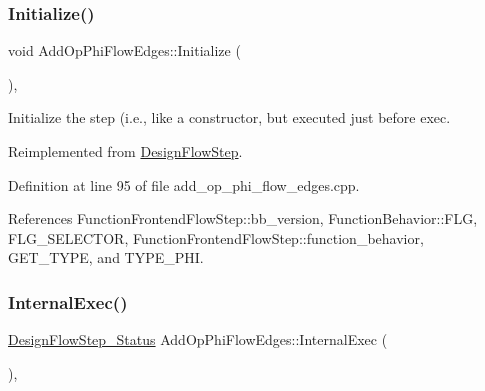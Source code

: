 \mbox{\label{classAddOpPhiFlowEdges_aad46abbd148a9b7a63117184c2366c40}} 
\subsubsection{\texorpdfstring{Initialize()}{Initialize()}}
{\footnotesize\ttfamily void Add\+Op\+Phi\+Flow\+Edges\+::\+Initialize (\begin{DoxyParamCaption}{ }\end{DoxyParamCaption})\hspace{0.3cm}{\ttfamily [override]}, {\ttfamily [virtual]}}



Initialize the step (i.\+e., like a constructor, but executed just before exec. 



Reimplemented from \hyperlink{classDesignFlowStep_a44b50683382a094976e1d432a7784799}{Design\+Flow\+Step}.



Definition at line 95 of file add\+\_\+op\+\_\+phi\+\_\+flow\+\_\+edges.\+cpp.



References Function\+Frontend\+Flow\+Step\+::bb\+\_\+version, Function\+Behavior\+::\+F\+LG, F\+L\+G\+\_\+\+S\+E\+L\+E\+C\+T\+OR, Function\+Frontend\+Flow\+Step\+::function\+\_\+behavior, G\+E\+T\+\_\+\+T\+Y\+PE, and T\+Y\+P\+E\+\_\+\+P\+HI.

\mbox{\label{classAddOpPhiFlowEdges_a9048d91ea14da87e31587780a5261c34}} 
\subsubsection{\texorpdfstring{Internal\+Exec()}{InternalExec()}}
{\footnotesize\ttfamily \hyperlink{design__flow__step_8hpp_afb1f0d73069c26076b8d31dbc8ebecdf}{Design\+Flow\+Step\+\_\+\+Status} Add\+Op\+Phi\+Flow\+Edges\+::\+Internal\+Exec (\begin{DoxyParamCaption}{ }\end{DoxyParamCaption})\hspace{0.3cm}{\ttfamily [override]}, {\ttfamily [virtual]}}



